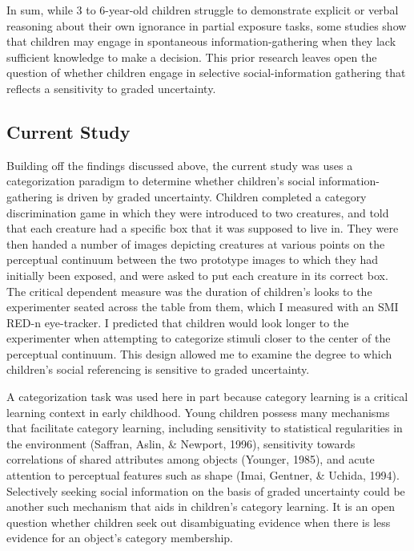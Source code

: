 \documentclass[floatsintext,man]{apa6}
\theoremstyle{definition}
\theoremstyle{definition}
\theoremstyle{definition}
\theoremstyle{remark}
\begin{document}
In sum, while 3 to 6-year-old children struggle to demonstrate explicit
or verbal reasoning about their own ignorance in partial exposure tasks,
some studies show that children may engage in spontaneous
information-gathering when they lack sufficient knowledge to make a
decision. This prior research leaves open the question of whether
children engage in selective social-information gathering that reflects
a sensitivity to graded uncertainty.

\subsection{Current Study}\label{current-study}

Building off the findings discussed above, the current study was uses a
categorization paradigm to determine whether children's social
information-gathering is driven by graded uncertainty. Children
completed a category discrimination game in which they were introduced
to two creatures, and told that each creature had a specific box that it
was supposed to live in. They were then handed a number of images
depicting creatures at various points on the perceptual continuum
between the two prototype images to which they had initially been
exposed, and were asked to put each creature in its correct box. The
critical dependent measure was the duration of children's looks to the
experimenter seated across the table from them, which I measured with an
SMI RED-n eye-tracker. I predicted that children would look longer to
the experimenter when attempting to categorize stimuli closer to the
center of the perceptual continuum. This design allowed me to examine
the degree to which children's social referencing is sensitive to graded
uncertainty.

A categorization task was used here in part because category learning is
a critical learning context in early childhood. Young children possess
many mechanisms that facilitate category learning, including sensitivity
to statistical regularities in the environment (Saffran, Aslin, \&
Newport, 1996), sensitivity towards correlations of shared attributes
among objects (Younger, 1985), and acute attention to perceptual
features such as shape (Imai, Gentner, \& Uchida, 1994). Selectively
seeking social information on the basis of graded uncertainty could be
another such mechanism that aids in children's category learning. It is
an open question whether children seek out disambiguating evidence when
there is less evidence for an object's category membership.
\end{document}
